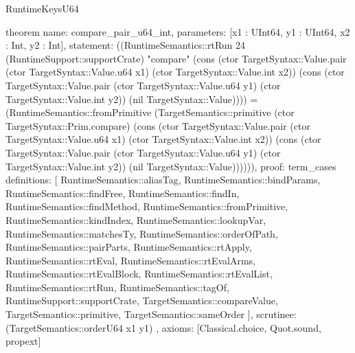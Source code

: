 \begin{lexlean}{RuntimeKeysU64}
\begin{semanticmodule}
theorem{
  name: compare_pair_u64_int,
  parameters: [x1 : UInt64, y1 : UInt64, x2 : Int, y2 : Int],
  statement: ((RuntimeSemantics::rtRun 24 (RuntimeSupport::supportCrate) "compare" (cons (ctor TargetSyntax::Value.pair (ctor TargetSyntax::Value.u64 x1) (ctor TargetSyntax::Value.int x2)) (cons (ctor TargetSyntax::Value.pair (ctor TargetSyntax::Value.u64 y1) (ctor TargetSyntax::Value.int y2)) (nil TargetSyntax::Value)))) = (RuntimeSemantics::fromPrimitive (TargetSemantics::primitive (ctor TargetSyntax::Prim.compare) (cons (ctor TargetSyntax::Value.pair (ctor TargetSyntax::Value.u64 x1) (ctor TargetSyntax::Value.int x2)) (cons (ctor TargetSyntax::Value.pair (ctor TargetSyntax::Value.u64 y1) (ctor TargetSyntax::Value.int y2)) (nil TargetSyntax::Value)))))),
  proof: term_cases{
    definitions: [
      RuntimeSemantics::aliasTag,
      RuntimeSemantics::bindParams,
      RuntimeSemantics::findFree,
      RuntimeSemantics::findIn,
      RuntimeSemantics::findMethod,
      RuntimeSemantics::fromPrimitive,
      RuntimeSemantics::kindIndex,
      RuntimeSemantics::lookupVar,
      RuntimeSemantics::matchesTy,
      RuntimeSemantics::orderOfPath,
      RuntimeSemantics::pairParts,
      RuntimeSemantics::rtApply,
      RuntimeSemantics::rtEval,
      RuntimeSemantics::rtEvalArms,
      RuntimeSemantics::rtEvalBlock,
      RuntimeSemantics::rtEvalList,
      RuntimeSemantics::rtRun,
      RuntimeSemantics::tagOf,
      RuntimeSupport::supportCrate,
      TargetSemantics::compareValue,
      TargetSemantics::primitive,
      TargetSemantics::sameOrder
    ],
    scrutinee: (TargetSemantics::orderU64 x1 y1)
  },
  axioms: [Classical.choice, Quot.sound, propext]
}


\end{semanticmodule}
\end{lexlean}
